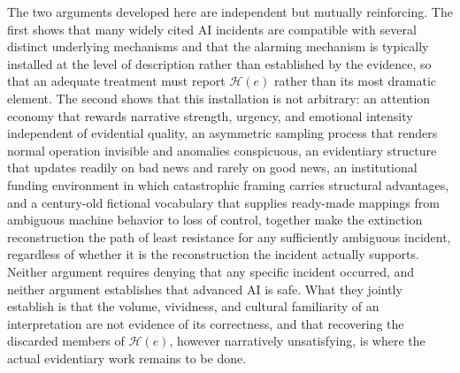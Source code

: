 \documentclass[11pt]{article}
\begin{document}
The two arguments developed here are independent but mutually reinforcing. The first shows that many widely cited AI incidents are compatible with several distinct underlying mechanisms and that the alarming mechanism is typically installed at the level of description rather than established by the evidence, so that an adequate treatment must report $\mathcal{H}(e)$ rather than its most dramatic element. The second shows that this installation is not arbitrary: an attention economy that rewards narrative strength, urgency, and emotional intensity independent of evidential quality, an asymmetric sampling process that renders normal operation invisible and anomalies conspicuous, an evidentiary structure that updates readily on bad news and rarely on good news, an institutional funding environment in which catastrophic framing carries structural advantages, and a century-old fictional vocabulary that supplies ready-made mappings from ambiguous machine behavior to loss of control, together make the extinction reconstruction the path of least resistance for any sufficiently ambiguous incident, regardless of whether it is the reconstruction the incident actually supports. Neither argument requires denying that any specific incident occurred, and neither argument establishes that advanced AI is safe. What they jointly establish is that the volume, vividness, and cultural familiarity of an interpretation are not evidence of its correctness, and that recovering the discarded members of $\mathcal{H}(e)$, however narratively unsatisfying, is where the actual evidentiary work remains to be done.
\end{document}
